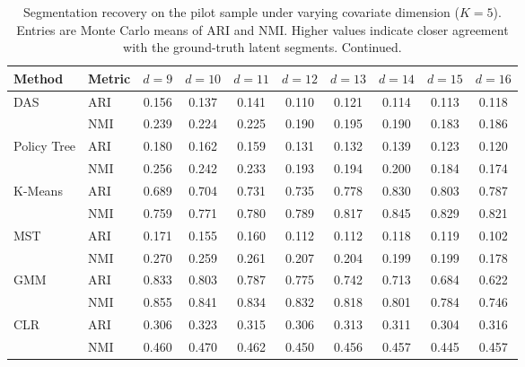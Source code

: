 \begin{table}[htbp]
\centering
\caption{Segmentation recovery on the pilot sample under varying covariate dimension ($K=5$). Entries are Monte Carlo means of ARI and NMI. Higher values indicate closer agreement with the ground-truth latent segments. Continued.}
\label{tab:app-ari-nmi-varying-d-cont}
\begin{tabular}{llcccccccc}
\toprule
Method & Metric & $d=9$ & $d=10$ & $d=11$ & $d=12$ & $d=13$ & $d=14$ & $d=15$ & $d=16$ \\
\midrule
DAS & ARI & 0.156 & 0.137 & 0.141 & 0.110 & 0.121 & 0.114 & 0.113 & 0.118 \\
 & NMI & 0.239 & 0.224 & 0.225 & 0.190 & 0.195 & 0.190 & 0.183 & 0.186 \\
\addlinespace
Policy Tree & ARI & 0.180 & 0.162 & 0.159 & 0.131 & 0.132 & 0.139 & 0.123 & 0.120 \\
 & NMI & 0.256 & 0.242 & 0.233 & 0.193 & 0.194 & 0.200 & 0.184 & 0.174 \\
\addlinespace
K-Means & ARI & 0.689 & 0.704 & 0.731 & 0.735 & 0.778 & 0.830 & 0.803 & 0.787 \\
 & NMI & 0.759 & 0.771 & 0.780 & 0.789 & 0.817 & 0.845 & 0.829 & 0.821 \\
\addlinespace
MST & ARI & 0.171 & 0.155 & 0.160 & 0.112 & 0.112 & 0.118 & 0.119 & 0.102 \\
 & NMI & 0.270 & 0.259 & 0.261 & 0.207 & 0.204 & 0.199 & 0.199 & 0.178 \\
\addlinespace
GMM & ARI & 0.833 & 0.803 & 0.787 & 0.775 & 0.742 & 0.713 & 0.684 & 0.622 \\
 & NMI & 0.855 & 0.841 & 0.834 & 0.832 & 0.818 & 0.801 & 0.784 & 0.746 \\
\addlinespace
CLR & ARI & 0.306 & 0.323 & 0.315 & 0.306 & 0.313 & 0.311 & 0.304 & 0.316 \\
 & NMI & 0.460 & 0.470 & 0.462 & 0.450 & 0.456 & 0.457 & 0.445 & 0.457 \\
\bottomrule
\end{tabular}
\end{table}

